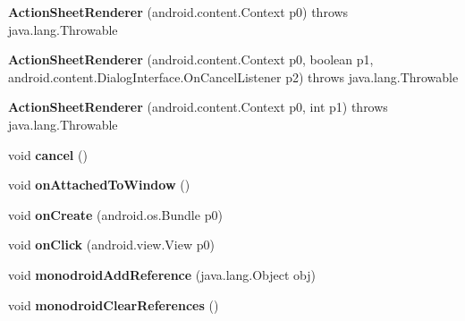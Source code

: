\begin{DoxyCompactItemize}
\item 
\mbox{\label{classmd5b60ffeb829f638581ab2bb9b1a7f4f3f_1_1_action_sheet_renderer_a477e90d5625841d42397451016a2083b}} 
{\bfseries Action\+Sheet\+Renderer} (android.\+content.\+Context p0)  throws java.\+lang.\+Throwable 	
\item 
\mbox{\label{classmd5b60ffeb829f638581ab2bb9b1a7f4f3f_1_1_action_sheet_renderer_ab6aa8d42c990fdb799b5266e29e12ec1}} 
{\bfseries Action\+Sheet\+Renderer} (android.\+content.\+Context p0, boolean p1, android.\+content.\+Dialog\+Interface.\+On\+Cancel\+Listener p2)  throws java.\+lang.\+Throwable 	
\item 
\mbox{\label{classmd5b60ffeb829f638581ab2bb9b1a7f4f3f_1_1_action_sheet_renderer_a1706d5f3027c6a9bbc7391f82ab29e8a}} 
{\bfseries Action\+Sheet\+Renderer} (android.\+content.\+Context p0, int p1)  throws java.\+lang.\+Throwable 	
\item 
\mbox{\label{classmd5b60ffeb829f638581ab2bb9b1a7f4f3f_1_1_action_sheet_renderer_a213358af9f3f2aee0abeeae66788d604}} 
void {\bfseries cancel} ()
\item 
\mbox{\label{classmd5b60ffeb829f638581ab2bb9b1a7f4f3f_1_1_action_sheet_renderer_a13de0c252c4cc2e9e3f02887c8673f47}} 
void {\bfseries on\+Attached\+To\+Window} ()
\item 
\mbox{\label{classmd5b60ffeb829f638581ab2bb9b1a7f4f3f_1_1_action_sheet_renderer_a4bcaeebda1585db4eb18c4353482bf5e}} 
void {\bfseries on\+Create} (android.\+os.\+Bundle p0)
\item 
\mbox{\label{classmd5b60ffeb829f638581ab2bb9b1a7f4f3f_1_1_action_sheet_renderer_a5df38c7adc6079f99eaf47b19cbb7974}} 
void {\bfseries on\+Click} (android.\+view.\+View p0)
\item 
\mbox{\label{classmd5b60ffeb829f638581ab2bb9b1a7f4f3f_1_1_action_sheet_renderer_af8ffa136f84a4104367ca2047aad806b}} 
void {\bfseries monodroid\+Add\+Reference} (java.\+lang.\+Object obj)
\item 
\mbox{\label{classmd5b60ffeb829f638581ab2bb9b1a7f4f3f_1_1_action_sheet_renderer_a2cba29a93ba3c95ecdf5198281ec137c}} 
void {\bfseries monodroid\+Clear\+References} ()
\end{DoxyCompactItemize}
